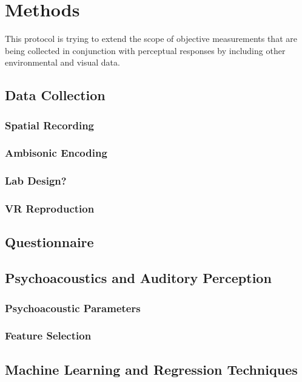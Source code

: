 \chapter{Methods}
\label{ch:methods}

This protocol is trying to extend the scope of objective measurements that are being collected in conjunction with perceptual responses by including other environmental and visual data.

\section{Data Collection}

  \subsection{Spatial Recording}

  \subsection{Ambisonic Encoding}

  \subsection{Lab Design?}

  \subsection{VR Reproduction}

\section{Questionnaire}

\section{Psychoacoustics and Auditory Perception}

  \subsection{Psychoacoustic Parameters}

  \subsection{Feature Selection}

\section{Machine Learning and Regression Techniques}

